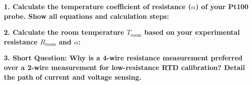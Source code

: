 \noindent
\textbf{1. Calculate the temperature coefficient of resistance ($\alpha$) of your Pt100 probe. Show all equations and calculation steps:}

\noindent
\textbf{2. Calculate the room temperature $T_{\text{room}}$ based on your experimental resistance $R_{\text{room}}$ and $\alpha$:}

\noindent
\textbf{3. Short Question: Why is a 4-wire resistance measurement preferred over a 2-wire measurement for low-resistance RTD calibration? Detail the path of current and voltage sensing.}
